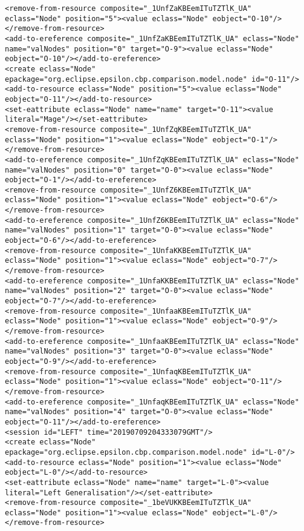 \begin{lstlisting}[style=cbpfile,caption={Change-based representation of the model in Figure \ref{fig:class_diagram_left}.},label=lst:class_diagram_left_cbpfile]
<remove-from-resource composite="_1UnfZaKBEemITuTZTlK_UA" eclass="Node" position="5"><value eclass="Node" eobject="O-10"/></remove-from-resource>
<add-to-ereference composite="_1UnfZaKBEemITuTZTlK_UA" eclass="Node" name="valNodes" position="0" target="O-9"><value eclass="Node" eobject="O-10"/></add-to-ereference>
<create eclass="Node" epackage="org.eclipse.epsilon.cbp.comparison.model.node" id="O-11"/>
<add-to-resource eclass="Node" position="5"><value eclass="Node" eobject="O-11"/></add-to-resource>
<set-eattribute eclass="Node" name="name" target="O-11"><value literal="Mage"/></set-eattribute>
<remove-from-resource composite="_1UnfZqKBEemITuTZTlK_UA" eclass="Node" position="1"><value eclass="Node" eobject="O-1"/></remove-from-resource>
<add-to-ereference composite="_1UnfZqKBEemITuTZTlK_UA" eclass="Node" name="valNodes" position="0" target="O-0"><value eclass="Node" eobject="O-1"/></add-to-ereference>
<remove-from-resource composite="_1UnfZ6KBEemITuTZTlK_UA" eclass="Node" position="1"><value eclass="Node" eobject="O-6"/></remove-from-resource>
<add-to-ereference composite="_1UnfZ6KBEemITuTZTlK_UA" eclass="Node" name="valNodes" position="1" target="O-0"><value eclass="Node" eobject="O-6"/></add-to-ereference>
<remove-from-resource composite="_1UnfaKKBEemITuTZTlK_UA" eclass="Node" position="1"><value eclass="Node" eobject="O-7"/></remove-from-resource>
<add-to-ereference composite="_1UnfaKKBEemITuTZTlK_UA" eclass="Node" name="valNodes" position="2" target="O-0"><value eclass="Node" eobject="O-7"/></add-to-ereference>
<remove-from-resource composite="_1UnfaaKBEemITuTZTlK_UA" eclass="Node" position="1"><value eclass="Node" eobject="O-9"/></remove-from-resource>
<add-to-ereference composite="_1UnfaaKBEemITuTZTlK_UA" eclass="Node" name="valNodes" position="3" target="O-0"><value eclass="Node" eobject="O-9"/></add-to-ereference>
<remove-from-resource composite="_1UnfaqKBEemITuTZTlK_UA" eclass="Node" position="1"><value eclass="Node" eobject="O-11"/></remove-from-resource>
<add-to-ereference composite="_1UnfaqKBEemITuTZTlK_UA" eclass="Node" name="valNodes" position="4" target="O-0"><value eclass="Node" eobject="O-11"/></add-to-ereference>
<session id="LEFT" time="20190709204333079GMT"/>
<create eclass="Node" epackage="org.eclipse.epsilon.cbp.comparison.model.node" id="L-0"/>
<add-to-resource eclass="Node" position="1"><value eclass="Node" eobject="L-0"/></add-to-resource>
<set-eattribute eclass="Node" name="name" target="L-0"><value literal="Left Generalisation"/></set-eattribute>
<remove-from-resource composite="_1beVUKKBEemITuTZTlK_UA" eclass="Node" position="1"><value eclass="Node" eobject="L-0"/></remove-from-resource>

\end{lstlisting}
